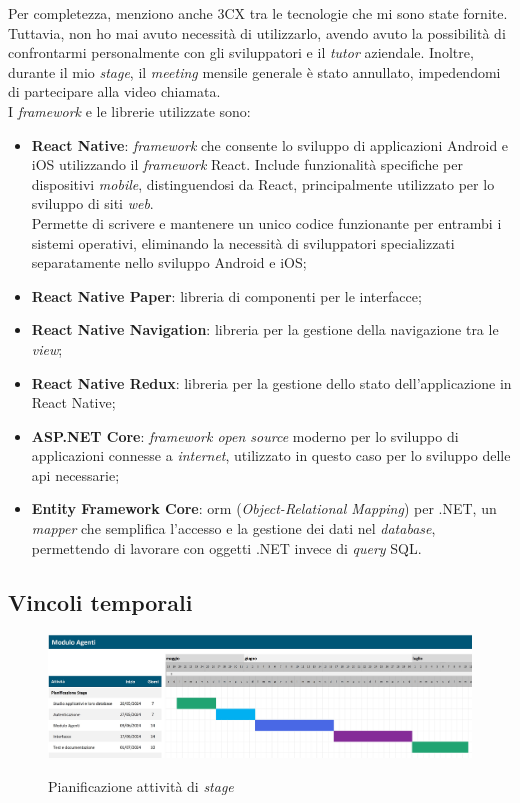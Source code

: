Per completezza, menziono anche 3CX tra le tecnologie che mi sono state fornite. Tuttavia, non ho mai avuto necessità di utilizzarlo,
avendo avuto la possibilità di confrontarmi personalmente con gli sviluppatori e il \textit{tutor} aziendale. Inoltre, durante
il mio \textit{stage}, il \textit{meeting} mensile generale è stato annullato, impedendomi di partecipare alla video chiamata.\\
I \textit{framework} e le librerie utilizzate sono:
\begin{itemize}
      \item \textbf{React Native}: \textit{framework} che consente lo sviluppo di applicazioni Android e iOS utilizzando il
            \textit{framework} React. Include funzionalità specifiche per dispositivi \textit{mobile}, distinguendosi da
            React, principalmente utilizzato per lo sviluppo di siti \textit{web}.\\
            Permette di scrivere e mantenere un unico codice funzionante per entrambi i sistemi operativi, eliminando la necessità 
            di sviluppatori specializzati separatamente nello sviluppo Android e iOS;
      \item \textbf{React Native Paper}: libreria di componenti per le interfacce;
      \item \textbf{React Native Navigation}: libreria per la gestione della navigazione tra le \textit{view};
      \item \textbf{React Native Redux}: libreria per la gestione dello stato dell'applicazione in React Native;
      \item \textbf{ASP.NET Core}: \textit{framework open source} moderno per lo sviluppo di applicazioni connesse a \textit{internet},
            utilizzato in questo caso per lo sviluppo delle \gls{api} necessarie;
      \item \textbf{Entity Framework Core}: \gls{orm} (\textit{Object-Relational Mapping}) per .NET, un \textit{mapper} che 
            semplifica l'accesso e la gestione dei dati nel \textit{database}, permettendo di lavorare con oggetti .NET 
            invece di \textit{query} SQL.
\end{itemize}

\subsection{Vincoli temporali}\label{chap:vincoli temporali}
\begin{figure}[H]
    \centering
    \includegraphics[alt={Pianificazione attività di stage}, width=\textwidth]{img/gantt pianificazione.jpg}
    \caption[Pianificazione attività di \textit{stage}]
            {Pianificazione attività di \textit{stage}}
    \label{fig:pianificazione stage}
\end{figure}

